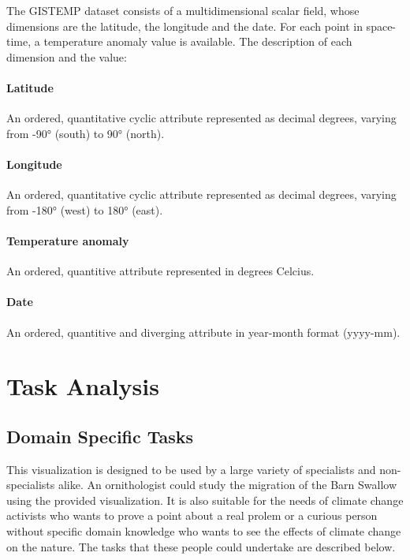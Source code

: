 \documentclass[journal]{vgtc}                %
\begin{document}
\vspace{2mm}

The GISTEMP dataset \cite{gistemp} consists of a multidimensional scalar field, whose dimensions are the latitude, the longitude and the date. For each point in space-time, a temperature anomaly value is available. The description of each dimension and the value:

\paragraph{Latitude} An ordered, quantitative cyclic attribute represented as decimal degrees, varying from -90° (south) to 90° (north).

\paragraph{Longitude} An ordered, quantitative cyclic attribute represented as decimal degrees, varying from -180° (west) to 180° (east).

\paragraph{Temperature anomaly} An ordered, quantitive attribute represented in degrees Celcius.

\paragraph{Date} An ordered, quantitive and diverging attribute in year-month format (yyyy-mm).

\section{Task Analysis}
\label{tasks}

\subsection{Domain Specific Tasks}

This visualization is designed to be used by a large variety of specialists and non-specialists alike. An ornithologist could study the migration of the Barn Swallow using the provided visualization. It is also suitable for the needs of climate  change activists who wants to prove a point about a real prolem or a curious person without specific domain knowledge who wants to see the effects of climate change on the nature. The tasks that  these people could undertake are described below.
\end{document}
